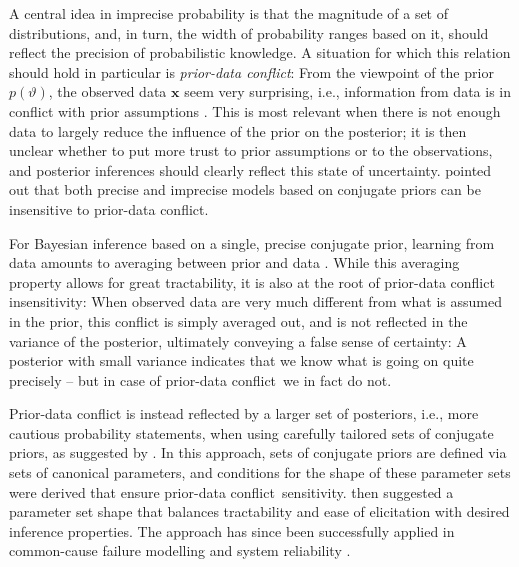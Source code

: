 \documentclass[runningheads,a4paper]{llncs}
\def\pdc{prior-data conflict}
\renewcommand{\vec}[1]{{\bm #1}}
\begin{document}
A central idea in imprecise probability is that the magnitude of a set of distributions,
and, in turn, the width of probability ranges based on it,
should reflect the precision of probabilistic knowledge.
A situation for which this relation should hold in particular is \emph{\pdc}:
From the viewpoint of the prior $p(\vartheta)$, the observed data $\vec{x}$ seem very surprising,
i.e., information from data is in conflict with prior assumptions \cite{2006:evans}. %
This is most relevant when there is not enough data to largely reduce the influence of the prior on the posterior;
it is then unclear whether to put more trust to prior assumptions or to the observations,
and posterior inferences should clearly reflect this state of uncertainty.
\cite{Walter2009a} pointed out that
both precise and imprecise models based on conjugate priors can be insensitive to prior-data conflict.

For Bayesian inference based on a single, precise conjugate prior,
learning from data amounts to averaging between prior and data
\cite[\S~1.2.3.1]{2013:diss-gw}.
While this averaging property allows for great tractability,
it is also at the root of prior-data conflict insensitivity: 
When observed data are very much different from what is assumed in the prior,
this conflict is simply averaged out,
and is not reflected in the variance of the posterior,
ultimately conveying a false sense of certainty:
A posterior with small variance indicates that we know what is going on quite precisely -- but in case of \pdc\ we in fact do not.

Prior-data conflict is instead reflected by a larger set of posteriors,
i.e., more cautious probability statements,
when using carefully tailored sets of conjugate priors,
as suggested by \cite{Walter2009a}.
In this approach, sets of conjugate priors are defined via sets of canonical parameters,
and conditions for the shape of these parameter sets were derived that ensure \pdc\ sensitivity.
\cite{Walter2009a} then suggested a parameter set shape
that balances tractability and ease of elicitation
with desired inference properties.
The approach has since been successfully applied in common-cause failure modelling \cite{Troffaes2014a}
and system reliability \cite{2015:walter}.
\end{document}
